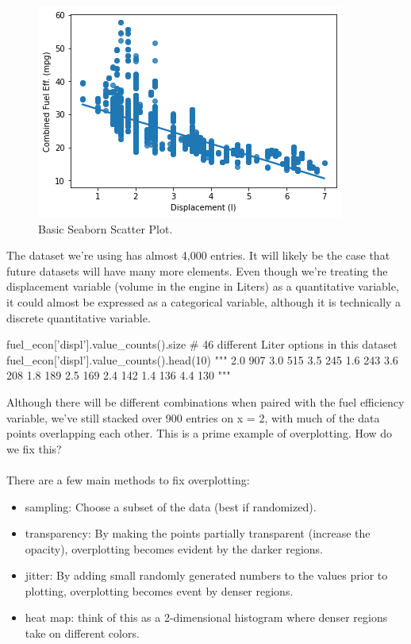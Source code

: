 \begin{figure}
	\includegraphics{images/figure16.png}
	\caption{Basic Seaborn Scatter Plot.}\label{fig:figure16}
\end{figure}

The dataset we're using has almost 4,000 entries. It will likely be the case that future datasets will have many more elements. Even though we're treating the displacement variable (volume in the engine in Liters) as a quantitative variable, it could almost be expressed as a categorical variable, although it is technically a discrete quantitative variable.

\begin{python}
	fuel_econ['displ'].value_counts().size
	# 46 different Liter options in this dataset
	fuel_econ['displ'].value_counts().head(10)
	"""
	2.0    907
	3.0    515
	3.5    245
	1.6    243
	3.6    208
	1.8    189
	2.5    169
	2.4    142
	1.4    136
	4.4    130
	"""
\end{python}

Although there will be different combinations when paired with the fuel efficiency variable, we've still stacked over 900 entries on x = 2, with much of the data points overlapping each other. This is a prime example of overplotting. How do we fix this?
\\\\

There are a few main methods to fix overplotting:

\begin{itemize}
	\item sampling: Choose a subset of the data (best if randomized).
	\item transparency: By making the points partially transparent (increase the opacity), overplotting becomes evident by the darker regions.
	\item jitter: By adding small randomly generated numbers to the values prior to plotting, overplotting becomes event by denser regions. 
	\item heat map: think of this as a 2-dimensional histogram where denser regions take on different colors.
\end{itemize}

